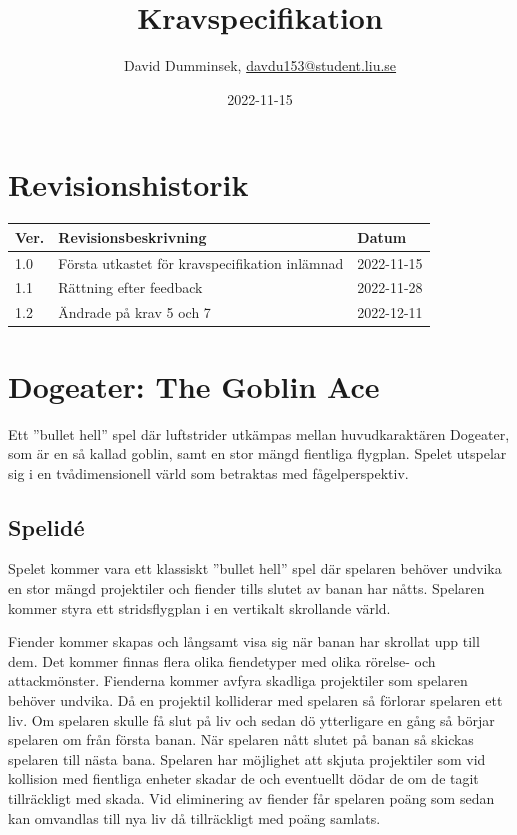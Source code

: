 \documentclass{TDP005mall}
\author{David Dumminsek, \url{davdu153@student.liu.se}\\
  }
\title{Kravspecifikation}
\date{2022-11-15}
\begin{document}
\projectpage
\section{Revisionshistorik}
\begin{table}[!h]
\begin{tabularx}{\linewidth}{|l|X|l|}
\hline
Ver. & Revisionsbeskrivning & Datum \\\hline
1.0 & Första utkastet för kravspecifikation inlämnad & 2022-11-15 \\\hline
1.1 & Rättning efter feedback & 2022-11-28 \\\hline
1.2 & Ändrade på krav 5 och 7 & 2022-12-11 \\\hline
\end{tabularx}
\end{table}
\tableofcontents
\clearpage
\section{Dogeater: The Goblin Ace}

Ett ''bullet hell'' spel där luftstrider utkämpas mellan huvudkaraktären Dogeater, som är en så kallad goblin, samt en stor mängd fientliga flygplan.
Spelet utspelar sig i en tvådimensionell värld som betraktas med fågelperspektiv.

\subsection{Spelidé}
Spelet kommer vara ett klassiskt ''bullet hell'' spel där spelaren behöver undvika en stor mängd projektiler och fiender tills slutet av banan har nåtts. 
Spelaren kommer styra ett stridsflygplan i en vertikalt skrollande värld.

Fiender kommer skapas och långsamt visa sig när banan har skrollat upp till dem. Det kommer finnas flera olika fiendetyper med olika rörelse- och attackmönster. 
Fienderna kommer avfyra skadliga projektiler som spelaren behöver undvika. Då en projektil kolliderar med spelaren så förlorar spelaren ett liv.
Om spelaren skulle få slut på liv och sedan dö ytterligare en gång så börjar spelaren om från första banan.
När spelaren nått slutet på banan så skickas spelaren till nästa bana.
Spelaren har möjlighet att skjuta projektiler som vid kollision med fientliga enheter skadar de och eventuellt dödar de om de tagit tillräckligt med skada.
Vid eliminering av fiender får spelaren poäng som sedan kan omvandlas till nya liv då tillräckligt med poäng samlats.
\end{document}
